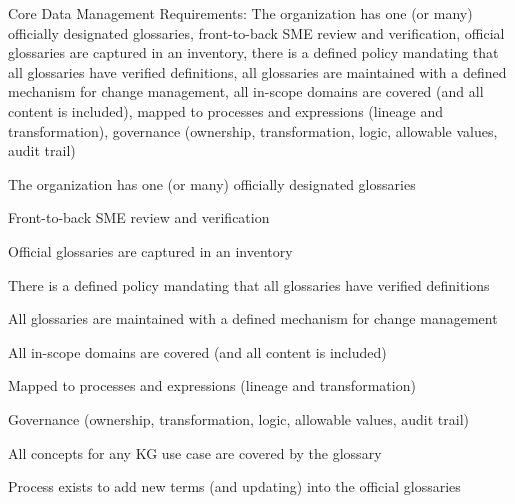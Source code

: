 \begin{members-only}

\kgmmscoringsection

Core Data Management Requirements: The organization has one (or many) officially designated glossaries,
front-to-back SME review and verification, official glossaries are captured in an inventory,
there is a defined policy mandating that all glossaries have verified definitions,
all glossaries are maintained with a defined mechanism for change management,
all in-scope domains are covered (and all content is included), mapped to processes and expressions
(lineage and transformation), governance (ownership, transformation, logic, allowable values, audit trail)

\kgmmscoringlevelOne

\begin{scoring}

  \item The organization has one (or many) officially designated glossaries
  \item Front-to-back SME review and verification
  \item Official glossaries are captured in an inventory
  \item There is a defined policy mandating that all glossaries have verified definitions
  \item All glossaries are maintained with a defined mechanism for change management
  \item All in-scope domains are covered (and all content is included)
  \item Mapped to processes and expressions (lineage and transformation)
  \item Governance (ownership, transformation, logic, allowable values, audit trail)

\end{scoring}

\kgmmscoringlevelTwo

\begin{scoring}

  \item All concepts for any KG use case are covered by the glossary
  \item Process exists to add new terms (and updating) into the official glossaries

\end{scoring}

\kgmmscoringlevelThree

\begin{scoring}


\end{scoring}
\end{members-only}
